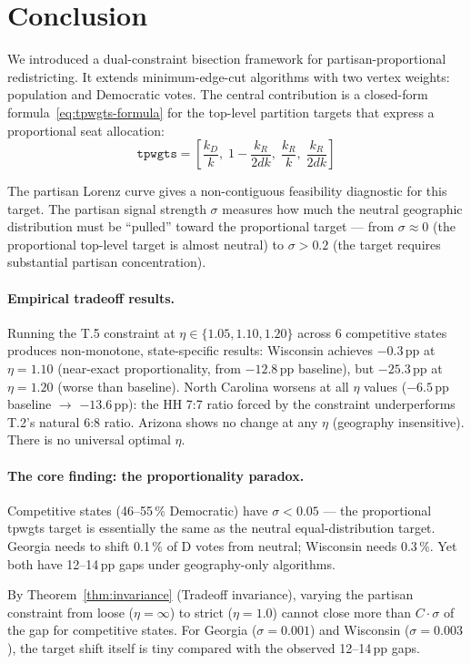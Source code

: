 \section{Conclusion}
\label{sec:conclusion}

We introduced a dual-constraint bisection framework for partisan-proportional
redistricting. It extends minimum-edge-cut algorithms with two vertex weights:
population and Democratic votes.
The central contribution is a closed-form formula~\eqref{eq:tpwgts-formula}
for the top-level partition targets that express a proportional seat allocation:
\[
  \mathtt{tpwgts} = \left[\frac{k_D}{k},\; 1 - \frac{k_R}{2dk},\;
                          \frac{k_R}{k},\; \frac{k_R}{2dk}\right]
\]

The partisan Lorenz curve gives a non-contiguous feasibility diagnostic for
this target.
The partisan signal strength $\sigma$ measures how much the neutral geographic
distribution must be ``pulled'' toward the proportional target --- from
$\sigma \approx 0$ (the proportional top-level target is almost neutral) to
$\sigma > 0.2$ (the target requires substantial partisan concentration).

\paragraph{Empirical tradeoff results.}
Running the T.5 constraint at $\eta \in \{1.05, 1.10, 1.20\}$ across 6 competitive
states produces non-monotone, state-specific results:
Wisconsin achieves $-0.3$\,pp at $\eta = 1.10$ (near-exact proportionality, from
$-12.8$\,pp baseline), but $-25.3$\,pp at $\eta = 1.20$ (worse than baseline).
North Carolina worsens at all $\eta$ values ($-6.5$\,pp baseline $\to$ $-13.6$\,pp):
the HH 7:7 ratio forced by the constraint underperforms T.2's natural 6:8 ratio.
Arizona shows no change at any $\eta$ (geography insensitive).
There is no universal optimal $\eta$.

\paragraph{The core finding: the proportionality paradox.}
Competitive states (46--55\,\% Democratic) have $\sigma < 0.05$ --- the
proportional tpwgts target is essentially the same as the neutral equal-distribution
target. Georgia needs to shift 0.1\,\% of D votes from neutral; Wisconsin needs
0.3\,\%. Yet both have 12--14\,pp gaps under geography-only algorithms.

By Theorem~\ref{thm:invariance} (Tradeoff invariance), varying the partisan
constraint from loose ($\eta = \infty$) to strict ($\eta = 1.0$) cannot close
more than $C \cdot \sigma$ of the gap for competitive states. For Georgia
($\sigma = 0.001$) and Wisconsin ($\sigma = 0.003$), the target shift itself is
tiny compared with the observed 12--14\,pp gaps.

